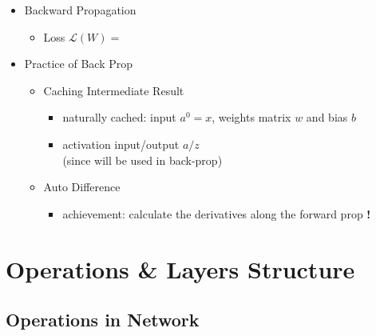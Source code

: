 \begin{itemize}
\item Backward Propagation
	\begin{itemize}
	\item Loss $\mathcal L(W) = $
	\end{itemize}

\item Practice of Back Prop
	\begin{itemize}
	\item Caching Intermediate Result
		\begin{itemize}
		\item naturally cached: input $a^0=x$, weights matrix $w$ and bias $b$
		\item activation input/output $a/z$ \\
		(since will be used in back-prop)
		\end{itemize}
	\item Auto Difference
		\begin{itemize}
		\item achievement: calculate the derivatives along the forward prop \textbf{!}
		\end{itemize}
	\end{itemize}
\end{itemize}


\section{Operations \& Layers Structure}
\subsection{Operations in Network}
